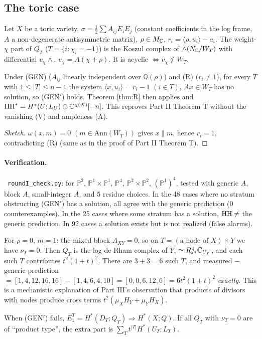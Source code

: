 \subsection{The toric case}\label{sec:toric}
Let $X$ be a toric variety, $\sigma=\tfrac12\sum A_{ij}E_iE_j$ (constant coefficients in the log frame, $A$ a non-degenerate antisymmetric matrix), $\rho\in M_\mathbb C$, $r_i=\langle\rho,u_i\rangle-a_i$. The weight-$\chi$ part of $Q_T$ ($T=\{i:\chi_i=-1\}$) is the Koszul complex of $\wedge(N_\mathbb C/W_T)$ with differential $v_\chi\wedge$, $v_\chi=A(\chi+\rho)$. It is acyclic $\iff v_\chi\notin W_T$. \tP
\begin{prop}\tP\label{prop:toric}
Under (GEN) ($A_{ij}$ linearly independent over $\mathbb Q(\rho)$) and (R) ($r_i\neq1$), for every $T$ with $1\le|T|\le n-1$ the system $\langle x,u_i\rangle=r_i-1$ $(i\in T)$, $Ax\in W_T$ has no solution, so (GEN$'$) holds. Theorem \ref{thm:R} then applies and $\mathrm{HH}^*=H^*(U;L_U)\oplus\mathbb C^{\chi(X)}[-n]$. This reproves Part II Theorem T without the vanishing (V) and ampleness (A).
\end{prop}
\begin{proof}[Sketch]
$\omega(x,m)=0$ $(m\in\mathrm{Ann}(W_T))$ gives $x\parallel m$, hence $r_i=1$, contradicting (R) (same as in the proof of Part II Theorem T).\qedhere
\end{proof}
\paragraph{Verification.}\tV\ \texttt{roundI\_check.py}: for $\mathbb P^2$, $\mathbb P^1\times\mathbb P^1$, $\mathbb P^4$, $\mathbb P^2\times\mathbb P^2$, $(\mathbb P^1)^4$, tested with generic $A$, block $A$, small-integer $A$, and 5 residue choices. In the 48 cases where no stratum obstructing (GEN$'$) has a solution, all agree with the generic prediction (0 counterexamples). In the 25 cases where some stratum has a solution, $\mathrm{HH}\neq$ the generic prediction. In 92 cases a solution exists but is not realized (false alarms).

\begin{ex}[$\mathbb P^2\times\mathbb P^2$, block $A=A_X\oplus A_Y$]\tP\tV
For $\rho=0$, $m=1$: the mixed block $A_{XY}=0$, so on $T=(\text{a node of }X)\times Y$ we have $\nu_T=0$. Then $Q_T$ is the log de Rham complex of $Y$, $\simeq Rj_*\mathbb C_{U_Y}$, and each such $T$ contributes $t^2(1+t)^2$. There are $3+3=6$ such $T$, and measured $-$ generic prediction $=[1,4,12,16,16]-[1,4,6,4,10]=[0,0,6,12,6]=6t^2(1+t)^2$ \emph{exactly}. This is a mechanistic explanation of Part III's observation that products of divisors with nodes produce cross terms $t^2(\mu_XH_Y+\mu_YH_X)$.
\end{ex}
\begin{conj}\label{conj:nonacyc}
When (GEN$'$) fails, $E_1^T=H^*(D_T;Q_T)\Rightarrow H^*(X;Q)$. If all $Q_T$ with $\nu_T=0$ are of ``product type'', the extra part is $\sum_Tt^{|T|}H^*(U_T;L_T)$.
\end{conj}

